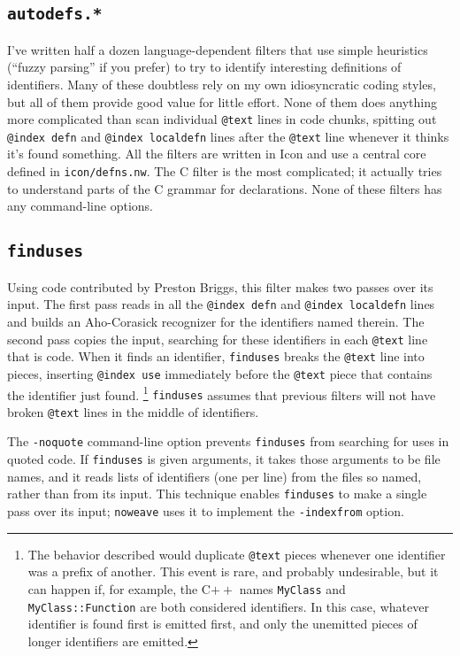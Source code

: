 \documentclass{article}
\makeatletter
\newcommand\kw[1]{\texttt{@#1}}
\newcommand\ikw[1]{\kw{index~#1}}
\newcommand\ltxlabel{\relax}
\let\ltxlabel=\label
\renewcommand\label{{\rm\it label\/}}
\makeatother
\begin{document}
\subsection{\tt autodefs.*}

I've written half a dozen language-dependent filters that use simple
heuristics (``fuzzy parsing'' if you prefer) to try to identify
interesting definitions of identifiers.
Many of these doubtless rely on my own idiosyncratic coding styles,
but all of them provide good value for little effort.
None of them does anything more complicated than scan individual
\kw{text} lines in code chunks, spitting out \ikw{defn}
and \ikw{localdefn} lines after
the \kw{text} line whenever it thinks it's found something.
All the filters are written in Icon and use a central core defined in
\verb+icon/defns.nw+. 
The C filter is the most complicated; it actually tries to understand
parts of the C grammar for declarations.
None of these filters has any command-line options.

\subsection{\tt finduses}

\ltxlabel{finduses}

Using code contributed by Preston Briggs, this filter makes two passes
over its input.
The first pass reads in all the \ikw{defn} and \ikw{localdefn} lines and builds an
Aho-Corasick recognizer for the identifiers named therein.
The second pass copies the input, searching for these identifiers in
each \kw{text} line that is code.
When it finds an identifier, {\tt finduses} breaks the \kw{text} line
into pieces, inserting \ikw{use} immediately before the \kw{text}
piece that contains the identifier just found.%
\footnote{The behavior described would duplicate \kw{text} pieces
whenever one identifier was a prefix of another.
This event is rare, and probably undesirable, but it can happen if,
for example, the C$++$ names {\tt MyClass} and {\tt MyClass::Function}
are both considered identifiers.
In this case, whatever identifier is found first is emitted first, and
only the unemitted pieces of longer identifiers are emitted.}
{\tt finduses} assumes that previous filters will not have broken
\kw{text} lines in the middle of identifiers.


The \verb+-noquote+ command-line option prevents {\tt finduses} from
searching for uses in quoted code.
If {\tt finduses} is given arguments, it takes those arguments to be
file names, and it reads lists of identifiers (one per line) from the
files so named, rather than from its input.
This technique enables {\tt finduses} to make a single pass over its
input; {\tt noweave} uses it to implement the {\tt -indexfrom} option.
\end{document}
